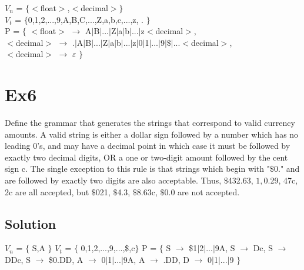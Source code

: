 \documentclass[12pt]{article}
\begin{document}
\begin{center}
    $V_n$ = $\{<$float$>$,$<$decimal$>\}$ \\
    $V_t$ = $\{$0,1,2,...,9,A,B,C,...,Z,a,b,c,...,z, .  $\}$ \\
    P = $\{ $ $<$float$>$ $\to$ A$|$B$|$...$|$Z$|$a$|$b$|$...$|$z$<$decimal$>$, \\
    $<$decimal$>$ $\to$ .$|$A$|$B$|$...$|$Z$|$a$|$b$|$...$|$z$|$0$|$1$|$...$|$9$|$$\$$$|$...$<$decimal$>$, \\
    $<$decimal$>$ $\to$ $\varepsilon$ $\}$
\end{center}



\section*{Ex6}
Define the grammar that generates the strings that correspond to valid currency
amounts. A valid string is either a dollar sign followed by a number which has no
leading 0's, and may have a decimal point in which case it must be followed by exactly
two decimal digits, OR a one or two-digit amount followed by the cent sign c. The
single exception to this rule is that strings which begin with "$\$0$." and are followed by
exactly two digits are also acceptable. Thus, $\$$432.63, $1, $0.29, 47c, 2c are all
accepted, but $\$$021, $\$$4.3, $\$$8.63c, $\$$0.0 are not accepted.

\subsection*{Solution}
\begin{center}
    $V_n$ = $\{$ S,A $\}$ \newline
    $V_t$ = $\{$ 0,1,2,...,9,...,\$,c$\}$ \newline
    P = $\{$ \newline
    S $\to$ \$1$|$2$|$...$|$9A, \newline
    S $\to$ Dc, \newline
    S $\to$ DDc, \newline
    S $\to$ \$0.DD, \newline
    A $\to$ 0$|$1$|$...$|$9A, \newline
    A $\to$ .DD, \newline
    D $\to$ 0$|$1$|$...$|$9 $\}$ \newline

\end{center}


\end{document}

